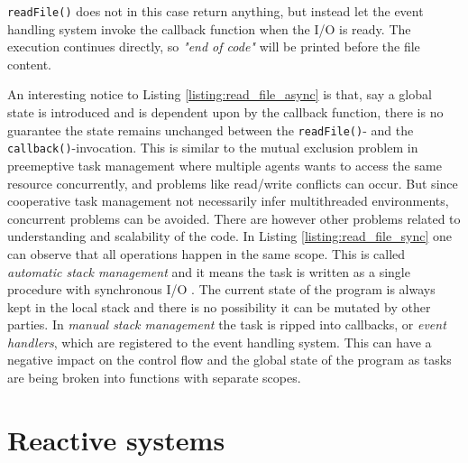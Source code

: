 

\lstinline{readFile()} does not in this case return anything, but instead let
the event handling system invoke the callback function when the I/O is ready.
The execution continues directly, so \textit{"end of code"} will be printed
before the file content.

An interesting notice to Listing \ref{listing:read_file_async} is that, say a
global state is introduced and is dependent upon by the callback function,
there is no guarantee the state remains unchanged between the
\lstinline{readFile()}- and the \lstinline{callback()}-invocation. This is
similar to the mutual exclusion problem in preemeptive task management where
multiple agents wants to access the same resource concurrently, and problems
like read/write conflicts can occur. But since cooperative task management not
necessarily infer multithreaded environments, concurrent problems can be
avoided. There are however other problems related to understanding and
scalability of the code. In Listing \ref{listing:read_file_sync} one can
observe that all operations happen in the same scope. This is called
\textit{automatic stack management} and it means the task is written as a
single procedure with synchronous I/O \cite{adya2002cooperative}. The current
state of the program is always kept in the local stack and there is no
possibility it can be mutated by other parties. In \textit{manual stack
management} the task is ripped into callbacks, or \textit{event handlers},
which are registered to the event handling system. This can have a negative
impact on the control flow and the global state of the program as tasks are
being broken into functions with separate scopes.


\section{Reactive systems}


